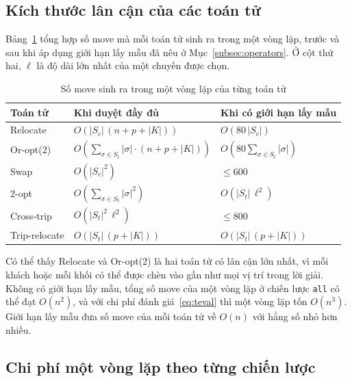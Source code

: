 \documentclass[../DoAn.tex]{subfiles}
\begin{document}
\subsection{Kích thước lân cận của các toán tử}

Bảng~\ref{tab:nbsize} tổng hợp số move mà mỗi toán tử sinh ra trong một vòng lặp, trước và sau khi áp dụng giới hạn lấy mẫu đã nêu ở Mục~\ref{subsec:operators}. Ở cột thứ hai, $\ell$ là độ dài lớn nhất của một chuyến được chọn.

\begin{table}[H]
\centering
\caption{Số move sinh ra trong một vòng lặp của từng toán tử}
\label{tab:nbsize}
\begin{tabular}{lll}
\toprule
\textbf{Toán tử} & \textbf{Khi duyệt đầy đủ} & \textbf{Khi có giới hạn lấy mẫu} \\
\midrule
Relocate      & $O(|S_c|\,(n + p + |K|))$       & $O(80\,|S_c|)$ \\
Or-opt(2)     & $O(\sum_{\sigma \in S_t} |\sigma| \cdot (n + p + |K|))$ & $O(80 \sum_{\sigma \in S_t} |\sigma|)$ \\
Swap          & $O(|S_c|^2)$                     & $\leq 600$ \\
2-opt         & $O(\sum_{\sigma \in S_t} |\sigma|^2)$ & $O(|S_t|\,\ell^2)$ \\
Cross-trip    & $O(|S_t|^2\,\ell^2)$             & $\leq 800$ \\
Trip-relocate & $O(|S_t|\,(p + |K|))$            & $O(|S_t|\,(p + |K|))$ \\
\bottomrule
\end{tabular}
\end{table}

Có thể thấy Relocate và Or-opt(2) là hai toán tử có lân cận lớn nhất, vì mỗi khách hoặc mỗi khối có thể được chèn vào gần như mọi vị trí trong lời giải. Không có giới hạn lấy mẫu, tổng số move của một vòng lặp ở chiến lược \texttt{all} có thể đạt $O(n^2)$, và với chi phí đánh giá~\eqref{eq:teval} thì một vòng lặp tốn $O(n^3)$. Giới hạn lấy mẫu đưa số move của mỗi toán tử về $O(n)$ với hằng số nhỏ hơn nhiều.

\subsection{Chi phí một vòng lặp theo từng chiến lược}
\end{document}
